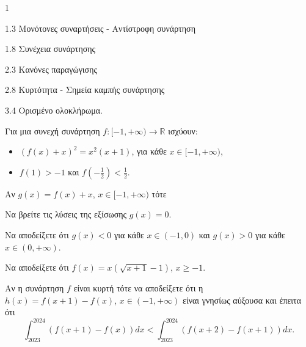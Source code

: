 \begin{ylh}{1}
    \item 1.3 Μονότονες συναρτήσεις - Αντίστροφη συνάρτηση
    \item 1.8 Συνέχεια συνάρτησης
    \item 2.3 Κανόνες παραγώγισης
    \item 2.8 Κυρτότητα - Σημεία καμπής συνάρτησης
    \item 3.4 Ορισμένο ολοκλήρωμα.
\end{ylh}


Για μια συνεχή συνάρτηση $f:[-1,+\infty) \to \mathbb{R}$ ισχύουν:
\begin{itemize}
    \item $(f(x)+x)^2 = x^2(x+1)$, για κάθε $x \in [-1,+\infty)$,
    \item $f(1)>-1$ και $f\left(-\frac{1}{2}\right)<\frac{1}{2}$.
\end{itemize}

\begin{alist}
    \item Αν $g(x)=f(x)+x$, $x \in [-1,+\infty)$ τότε
    \begin{rlist}
        \item Να βρείτε τις λύσεις της εξίσωσης $g(x)=0$. 
        \item Να αποδείξετε ότι $g(x)<0$ για κάθε $x \in (-1,0)$ και $g(x)>0$ για κάθε $x \in (0,+\infty)$. 
    \end{rlist}
    \item Να αποδείξετε ότι $f(x)=x(\sqrt{x+1}-1)$, $x \ge -1$. 
    \item Αν η συνάρτηση $f$ είναι κυρτή τότε να αποδείξετε ότι η $h(x)=f(x+1)-f(x)$, $x \in (-1,+\infty)$ είναι γνησίως αύξουσα και έπειτα ότι
    \[\int_{2023}^{2024}(f(x+1)-f(x))dx < \int_{2023}^{2024}(f(x+2)-f(x+1))dx.\] 
\end{alist}